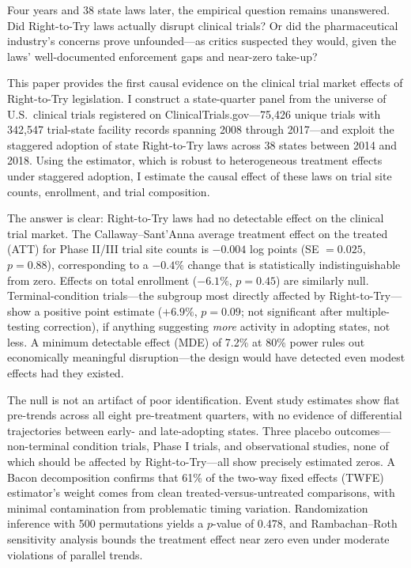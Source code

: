\documentclass[12pt]{article}
\begin{document}
Four years and 38 state laws later, the empirical question remains unanswered. Did Right-to-Try laws actually disrupt clinical trials? Or did the pharmaceutical industry's concerns prove unfounded---as critics suspected they would, given the laws' well-documented enforcement gaps and near-zero take-up?

This paper provides the first causal evidence on the clinical trial market effects of Right-to-Try legislation. I construct a state-quarter panel from the universe of U.S.\ clinical trials registered on ClinicalTrials.gov---75,426 unique trials with 342,547 trial-state facility records spanning 2008 through 2017---and exploit the staggered adoption of state Right-to-Try laws across 38 states between 2014 and 2018. Using the \citet{callaway2021difference} estimator, which is robust to heterogeneous treatment effects under staggered adoption, I estimate the causal effect of these laws on trial site counts, enrollment, and trial composition.

The answer is clear: Right-to-Try laws had no detectable effect on the clinical trial market. The Callaway--Sant'Anna average treatment effect on the treated (ATT) for Phase II/III trial site counts is $-0.004$ log points (SE $= 0.025$, $p = 0.88$), corresponding to a $-0.4\%$ change that is statistically indistinguishable from zero. Effects on total enrollment ($-6.1\%$, $p = 0.45$) are similarly null. Terminal-condition trials---the subgroup most directly affected by Right-to-Try---show a positive point estimate ($+6.9\%$, $p = 0.09$; not significant after multiple-testing correction), if anything suggesting \textit{more} activity in adopting states, not less. A minimum detectable effect (MDE) of 7.2\% at 80\% power rules out economically meaningful disruption---the design would have detected even modest effects had they existed.

The null is not an artifact of poor identification. Event study estimates show flat pre-trends across all eight pre-treatment quarters, with no evidence of differential trajectories between early- and late-adopting states. Three placebo outcomes---non-terminal condition trials, Phase I trials, and observational studies, none of which should be affected by Right-to-Try---all show precisely estimated zeros. A Bacon decomposition confirms that 61\% of the two-way fixed effects (TWFE) estimator's weight comes from clean treated-versus-untreated comparisons, with minimal contamination from problematic timing variation. Randomization inference with 500 permutations yields a $p$-value of 0.478, and Rambachan--Roth sensitivity analysis bounds the treatment effect near zero even under moderate violations of parallel trends.
\end{document}
